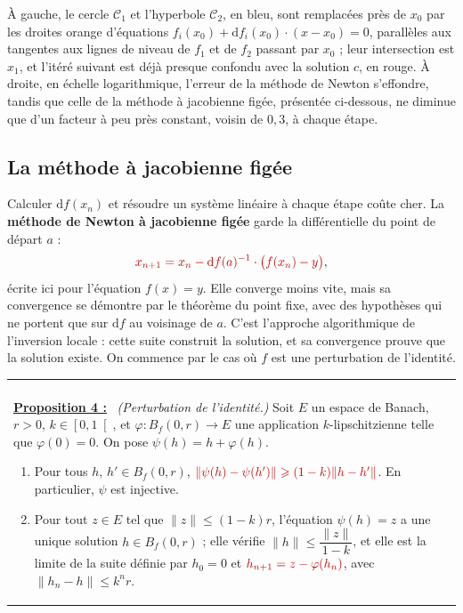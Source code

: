 \documentclass[a4paper,twoside]{report}
\makeatletter
\newcommand{\mot}[1]{\textcolor{rougecours}{\textbf{#1}}}
\newcommand{\rmath}[1]{\textcolor{rougecours}{#1}}
\newenvironment{cadre}%
 {\par\vspace{2mm}\noindent\begin{tabular}{|@{\hspace{4mm}}p{0.93\textwidth}@{\hspace{4mm}}|}
  \hline \\[-2mm]}%
 {\\[2mm] \hline \end{tabular}\par\vspace{3mm}}
\newcommand{\propo}[1]{\textbf{\underline{Proposition #1 :}}~}
\newcommand{\dd}{\mathrm{d}}                      %
\newcommand{\norme}[1]{\lVert #1 \rVert}         %
\newcommand{\Bf}{B_{f}}                           %
\makeatother
\begin{document}
\noindent À gauche, le cercle $\mathcal{C}_{1}$ et l'hyperbole $\mathcal{C}_{2}$, en bleu, sont remplacées près de $x_{0}$ par les droites orange d'équations $f_{i}(x_{0}) + \dd f_{i}(x_{0})\cdot(x - x_{0}) = 0$, parallèles aux tangentes aux lignes de niveau de $f_{1}$ et de $f_{2}$ passant par $x_{0}$ ; leur intersection est $x_{1}$, et l'itéré suivant est déjà presque confondu avec la solution $c$, en rouge. À droite, en échelle logarithmique, l'erreur de la méthode de Newton s'effondre, tandis que celle de la méthode à jacobienne figée, présentée ci-dessous, ne diminue que d'un facteur à peu près constant, voisin de $0{,}3$, à chaque étape.

\subsection{La méthode à jacobienne figée}

Calculer $\dd f(x_{n})$ et résoudre un système linéaire à chaque étape coûte cher. La \mot{méthode de Newton à jacobienne figée} garde la différentielle du point de départ $a$ :
\[ \rmath{x_{n + 1} = x_{n} - \dd f(a)^{-1}\cdot\big(f(x_{n}) - y\big)}, \]
écrite ici pour l'équation $f(x) = y$. Elle converge moins vite, mais sa convergence se démontre par le théorème du point fixe, avec des hypothèses qui ne portent que sur $\dd f$ au voisinage de $a$. C'est l'approche algorithmique de l'inversion locale : cette suite construit la solution, et sa convergence prouve que la solution existe. On commence par le cas où $f$ est une perturbation de l'identité.

\begin{cadre}
\propo{4} \emph{(Perturbation de l'identité.)} Soit $E$ un espace de Banach, $r > 0$, $k \in \left[0, 1\right[$, et $\varphi : \Bf(0, r) \to E$ une application $k$-lipschitzienne telle que $\varphi(0) = 0$. On pose $\psi(h) = h + \varphi(h)$.
\begin{enumerate}[label=(\roman*),topsep=3pt,itemsep=2pt]
  \item Pour tous $h$, $h' \in \Bf(0, r)$, $\rmath{\norme{\psi(h) - \psi(h')} \geqslant (1 - k)\norme{h - h'}}$. En particulier, $\psi$ est injective.
  \item Pour tout $z \in E$ tel que $\norme{z} \leqslant (1 - k)r$, l'équation $\psi(h) = z$ a une unique solution $h \in \Bf(0, r)$ ; elle vérifie $\norme{h} \leqslant \dfrac{\norme{z}}{1 - k}$, et elle est la limite de la suite définie par $h_{0} = 0$ et $\rmath{h_{n + 1} = z - \varphi(h_{n})}$, avec $\norme{h_{n} - h} \leqslant k^{n}r$.
\end{enumerate}
\end{cadre}
\end{document}
